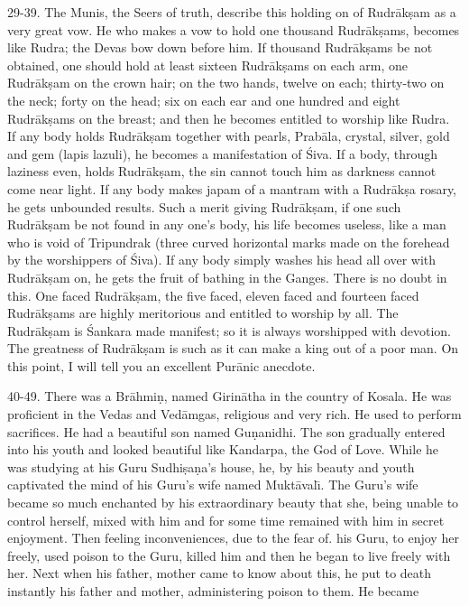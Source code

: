 29-39. The Munis, the Seers of truth, describe this holding on of Rudr\=ak\d{s}am as a very great vow. He who makes a vow to hold one thousand Rudr\=ak\d{s}ams, becomes like Rudra; the Devas bow down before him. If thousand Rudr\=ak\d{s}ams be not obtained, one should hold at least sixteen Rudr\=ak\d{s}ams on each arm, one Rudr\=ak\d{s}am on the crown hair; on the two hands, twelve on each; thirty-two on the neck; forty on the head; six on each ear and one hundred and eight Rudr\=ak\d{s}ams on the breast; and then he becomes entitled to worship like Rudra. If any body holds Rudr\=ak\d{s}am together with pearls, Prab\=ala, crystal, silver, gold and gem (lapis lazuli), he becomes a manifestation of \'Siva. If a body, through laziness even, holds Rudr\=ak\d{s}am, the sin cannot touch him as darkness cannot come near light. If any body makes japam of a mantram with a Rudr\=ak\d{s}a rosary, he gets unbounded results. Such a merit giving Rudr\=ak\d{s}am, if one such Rudr\=ak\d{s}am be not found in any one's body, his life becomes useless, like a man who is void of Tripundrak (three curved horizontal marks made on the forehead by the worshippers of \'Siva). If any body simply washes his head all over with Rudr\=ak\d{s}am on, he gets the fruit of bathing in the Ganges. There is no doubt in this. One faced Rudr\=ak\d{s}am, the five faced, eleven faced and fourteen faced Rudr\=ak\d{s}ams are highly meritorious and entitled to worship by all. The Rudr\=ak\d{s}am is \'Sankara made manifest; so it is always worshipped with devotion. The greatness of Rudr\=ak\d{s}am is such as it can make a king out of a poor man. On this point, I will tell you an excellent Pur\=anic anecdote.

40-49. There was a Br\=ahmi\d{n}, named Girin\=atha in the country of Kosala. He was proficient in the Vedas and Ved\=amgas, religious and very rich. He used to perform sacrifices. He had a beautiful son named Gu\d{n}anidhi. The son gradually entered into his youth and looked beautiful like Kandarpa, the God of Love. While he was studying at his Guru Sudhi\d{s}a\d{n}a's house, he, by his beauty and youth captivated the mind of his Guru's wife named Mukt\=aval\={\i}. The Guru's wife became so much enchanted by his extraordinary beauty that she, being unable to control herself, mixed with him and for some time remained with him in secret enjoyment. Then feeling inconveniences, due to the fear of. his Guru, to enjoy her freely, used poison to the Guru, killed him and then he began to live freely with her. Next when his father, mother came to know about this, he put to death instantly his father and mother, administering poison to them. He became

